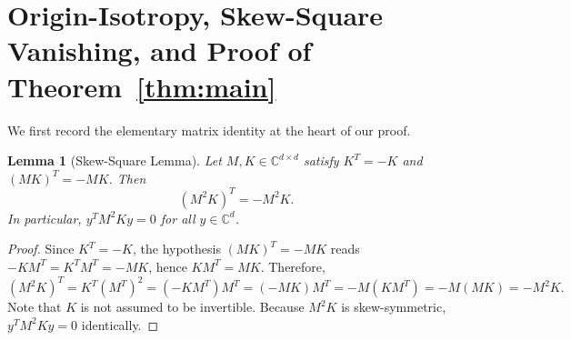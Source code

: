 \documentclass[11pt,a4paper]{article}
\newtheorem{lemma}[theorem]{Lemma}
\theoremstyle{definition}
\begin{document}
\section{Origin-Isotropy, Skew-Square Vanishing, and Proof of Theorem~\ref{thm:main}}\label{sec:mainproof}

We first record the elementary matrix identity at the heart of our proof.

\begin{lemma}[Skew-Square Lemma]\label{lem:skewsquare}
Let $M, K \in \mathbb{C}^{d \times d}$ satisfy $K^T = -K$ and $(MK)^T = -MK$. Then
\[
  (M^2 K)^T = -M^2 K.
\]
In particular, $y^T M^2 K y = 0$ for all $y \in \mathbb{C}^d$.
\end{lemma}

\begin{proof}
Since $K^T = -K$, the hypothesis $(MK)^T = -MK$ reads $-K M^T = K^T M^T = -MK$, hence $K M^T = MK$. Therefore,
\[
  (M^2 K)^T = K^T (M^T)^2 = (-K M^T) M^T = (-MK) M^T = -M(K M^T) = -M(MK) = -M^2 K.
\]
Note that $K$ is not assumed to be invertible. Because $M^2 K$ is skew-symmetric, $y^T M^2 K y = 0$ identically.
\end{proof}
\end{document}
